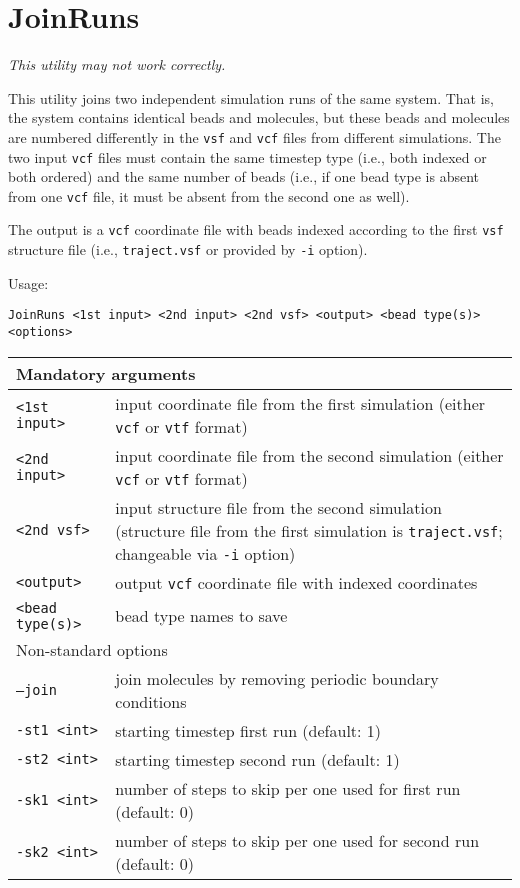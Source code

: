 \section{JoinRuns} \label{sec:JoinRuns}

{\it This utility may not work correctly.}

This utility joins two independent simulation runs of the same system.
That is, the system contains identical beads and molecules, but these beads
and molecules are numbered differently in the \texttt{vsf} and \texttt{vcf}
files from different simulations. The two input \texttt{vcf} files must
contain the same timestep type (i.e., both indexed or both ordered) and the
same number of beads (i.e., if one bead type is absent from one
\texttt{vcf} file, it must be absent from the second one as well).

The output is a \texttt{vcf} coordinate file with beads indexed according
to the first \texttt{vsf} structure file (i.e., \texttt{traject.vsf} or
provided by \texttt{-i} option).

Usage:

\vspace{1em}
\noindent
\texttt{JoinRuns <1st input> <2nd input> <2nd vsf> <output> <bead type(s)> \\ <options>}

\vspace{1em}
\noindent
\begin{longtable}{p{}p{}}
  \toprule
  \multicolumn{2}{l}{Mandatory arguments} \\
  \midrule
  \texttt{<1st input>} & input coordinate file from the first simulation (either \texttt{vcf} or
    \texttt{vtf} format) \\
  \texttt{<2nd input>} & input coordinate file from the second simulation (either \texttt{vcf} or
    \texttt{vtf} format) \\
  \texttt{<2nd vsf>} & input structure file from the second simulation
    (structure file from the first simulation is \texttt{traject.vsf};
    changeable via \texttt{-i} option) \\
  \texttt{<output>} & output \texttt{vcf} coordinate file with indexed
    coordinates \\
  \texttt{<bead type(s)>} & bead type names to save \\
  \toprule
  \multicolumn{2}{l}{Non-standard options} \\
  \midrule
  \texttt{--join} & join molecules by removing periodic boundary conditions \\
  \texttt{-st1 <int>} & starting timestep first run (default: 1) \\
  \texttt{-st2 <int>} & starting timestep second run (default: 1) \\
  \texttt{-sk1 <int>} & number of steps to skip per one used for first run (default: 0) \\
  \texttt{-sk2 <int>} & number of steps to skip per one used for second run (default: 0) \\
  \bottomrule
\end{longtable}
